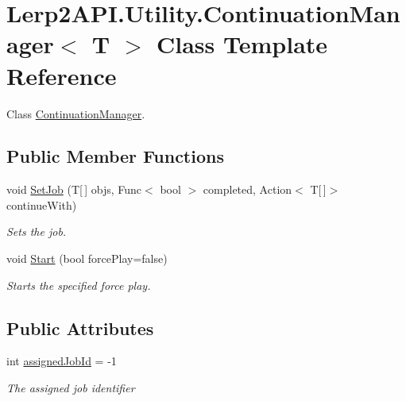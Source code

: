 \hypertarget{class_lerp2_a_p_i_1_1_utility_1_1_continuation_manager}{}\section{Lerp2\+A\+P\+I.\+Utility.\+Continuation\+Manager$<$ T $>$ Class Template Reference}
\label{class_lerp2_a_p_i_1_1_utility_1_1_continuation_manager}


Class \hyperlink{class_lerp2_a_p_i_1_1_utility_1_1_continuation_manager}{Continuation\+Manager}.  


\subsection*{Public Member Functions}
\begin{DoxyCompactItemize}
\item 
void \hyperlink{class_lerp2_a_p_i_1_1_utility_1_1_continuation_manager_a5ea664c9774b48456941b39f38bce7ce}{Set\+Job} (T\mbox{[}$\,$\mbox{]} objs, Func$<$ bool $>$ completed, Action$<$ T\mbox{[}$\,$\mbox{]}$>$ continue\+With)
\begin{DoxyCompactList}\small\item\em Sets the job. \end{DoxyCompactList}\item 
void \hyperlink{class_lerp2_a_p_i_1_1_utility_1_1_continuation_manager_a58af58722b7da1a8a3d7d285f6477149}{Start} (bool force\+Play=false)
\begin{DoxyCompactList}\small\item\em Starts the specified force play. \end{DoxyCompactList}\end{DoxyCompactItemize}
\subsection*{Public Attributes}
\begin{DoxyCompactItemize}
\item 
int \hyperlink{class_lerp2_a_p_i_1_1_utility_1_1_continuation_manager_ad61df6f6506156539d46d550894fba06}{assigned\+Job\+Id} = -\/1
\begin{DoxyCompactList}\small\item\em The assigned job identifier \end{DoxyCompactList}\end{DoxyCompactItemize}


